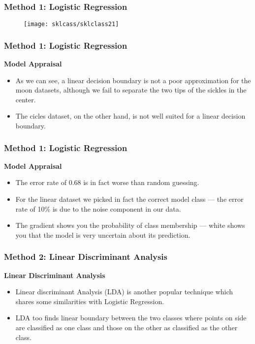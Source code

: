 \documentclass[MASTER.tex]{subfiles}
\begin{document}
\begin{frame}
		\frametitle{Method 1: Logistic Regression}
	\begin{figure}
		\centering
		\texttt{[image: sklcass/sklclass21]}
		
	\end{figure}
\end{frame}
\begin{frame}
	\frametitle{Method 1: Logistic Regression}
	\Large
	\textbf{Model Appraisal}
\begin{itemize}
\item	As we can see, a linear decision boundary is not a poor approximation for the moon datasets, although we fail to separate the two tips of the sickles in the center. 
\item The cicles dataset, on the other hand, is not well suited for a linear decision boundary. 
\end{itemize}
\end{frame}
\begin{frame}
	\frametitle{Method 1: Logistic Regression}
		\Large
		\textbf{Model Appraisal}
	\begin{itemize}
		
		\item The error rate of 0.68 is in fact worse than random guessing. \item For the linear dataset we picked in fact the correct model class — the error rate of 10\% is due to the noise component in our data. 
\item The gradient shows you the probability of class membership — white shows you that the model is very uncertain about its prediction.
\end{itemize}

\end{frame}

\begin{frame}
\frametitle{Method 2: Linear Discriminant Analysis}
\Large
\textbf{Linear Discriminant Analysis}
\begin{itemize}
\item Linear discriminant Analysis (LDA) is another popular technique which shares some similarities with Logistic Regression. 
\item LDA too finds linear boundary between the two classes where points on side are classified as one class and those on the other as classified as the other class.
\end{itemize}

\end{frame}
\end{document}
